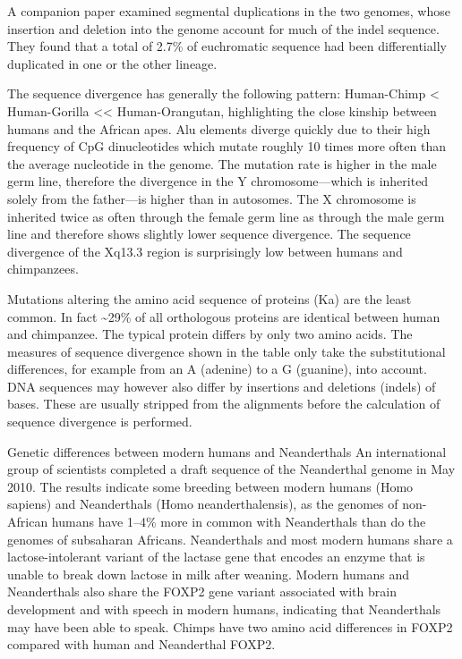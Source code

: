 A companion paper examined segmental duplications in the two genomes, whose insertion and deletion into the genome account for much of the indel sequence. They found that a total of 2.7\% of euchromatic sequence had been differentially duplicated in one or the other lineage.

The sequence divergence has generally the following pattern: Human-Chimp \textless{} Human-Gorilla \textless{}\textless{} Human-Orangutan, highlighting the close kinship between humans and the African apes. Alu elements diverge quickly due to their high frequency of CpG dinucleotides which mutate roughly 10 times more often than the average nucleotide in the genome. The mutation rate is higher in the male germ line, therefore the divergence in the Y chromosome---which is inherited solely from the father---is higher than in autosomes. The X chromosome is inherited twice as often through the female germ line as through the male germ line and therefore shows slightly lower sequence divergence. The sequence divergence of the Xq13.3 region is surprisingly low between humans and chimpanzees.

Mutations altering the amino acid sequence of proteins (Ka) are the least common. In fact \textasciitilde{}29\% of all orthologous proteins are identical between human and chimpanzee. The typical protein differs by only two amino acids. The measures of sequence divergence shown in the table only take the substitutional differences, for example from an A (adenine) to a G (guanine), into account. DNA sequences may however also differ by insertions and deletions (indels) of bases. These are usually stripped from the alignments before the calculation of sequence divergence is performed.

Genetic differences between modern humans and Neanderthals
An international group of scientists completed a draft sequence of the Neanderthal genome in May 2010. The results indicate some breeding between modern humans (Homo sapiens) and Neanderthals (Homo neanderthalensis), as the genomes of non-African humans have 1--4\% more in common with Neanderthals than do the genomes of subsaharan Africans. Neanderthals and most modern humans share a lactose-intolerant variant of the lactase gene that encodes an enzyme that is unable to break down lactose in milk after weaning. Modern humans and Neanderthals also share the FOXP2 gene variant associated with brain development and with speech in modern humans, indicating that Neanderthals may have been able to speak. Chimps have two amino acid differences in FOXP2 compared with human and Neanderthal FOXP2.


